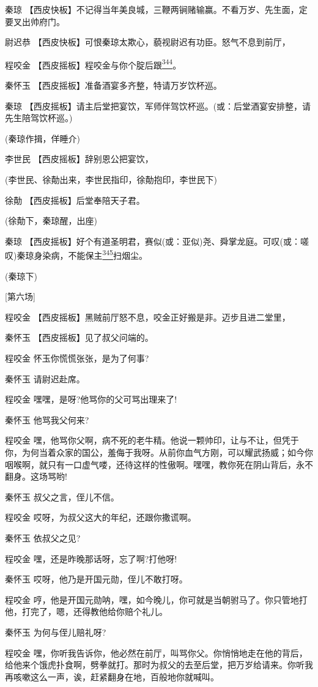 秦琼
【西皮快板】不记得当年美良城，三鞭两锏赌输赢。不看万岁、先生面，定要叉出帅府门。

尉迟恭 【西皮快板】可恨秦琼太欺心，藐视尉迟有功臣。怒气不息到前厅，

程咬金
【西皮摇板】程咬金与你个腚后跟\protect\hyperlink{fn344}{\textsuperscript{344}}。

秦怀玉 【西皮摇板】准备酒宴多齐整，特请万岁饮杯巡。

秦琼
【西皮摇板】请主后堂把宴饮，军师伴驾饮杯巡。(或：后堂酒宴安排整，请先生陪驾饮杯巡。)

(秦琼作揖，佯睡介)

李世民 【西皮摇板】辞别恩公把宴饮，

(李世民、徐勣出来，李世民指印，徐勣抱印，李世民下)

徐勣 【西皮摇板】后堂奉陪天子君。

(徐勣下，秦琼醒，出座)

秦琼
【西皮摇板】好个有道圣明君，赛似(或：亚似)尧、舜掌龙庭。可叹(或：嗟叹)秦琼身染病，不能保主\protect\hyperlink{fn345}{\textsuperscript{345}}扫烟尘。

(秦琼下)

{[}第六场{]}

程咬金 【西皮摇板】黑贼前厅怒不息，咬金正好搬是非。迈步且进二堂里，

秦怀玉 【西皮摇板】见了叔父问端的。

程咬金 怀玉你慌慌张张，是为了何事?

秦怀玉 请尉迟赴席。

程咬金 嘿嘿，是呀?他骂你的父可骂出理来了!

秦怀玉 他骂我父何来?

程咬金
嘿，他骂你父啊，病不死的老牛精。他说一颗帅印，让与不让，但凭于你，为何当着众家的国公，羞侮于我呀。从前你血气方刚，可以耀武扬威；如今你咽喉啊，就只有一口虚气喽，还待这样的性傲啊。嘿嘿，教你死在阴山背后，永不翻身。这场骂哟!

秦怀玉 叔父之言，侄儿不信。

程咬金 哎呀，为叔父这大的年纪，还跟你撒谎啊。

秦怀玉 依叔父之见?

程咬金 嘿，还是昨晚那话呀，忘了啊?打他呀!

秦怀玉 哎呀，他乃是开国元勋，侄儿不敢打呀。

程咬金
哼，他是开国元勋呐，嘿，如今晚儿，你可就是当朝驸马了。你只管地打他，打完了，嗯，还得教他给你赔个礼儿。

秦怀玉 为何与侄儿赔礼呀?

程咬金
嘿，你听我告诉你，他必然在前厅，叫骂你父。你悄悄地走在他的背后，给他来个饿虎扑食啊，劈拳就打。那时为叔父的去至后堂，把万岁给请来。你听我再咳嗽这么一声，诶，赶紧翻身在地，百般地你就喊叫。

